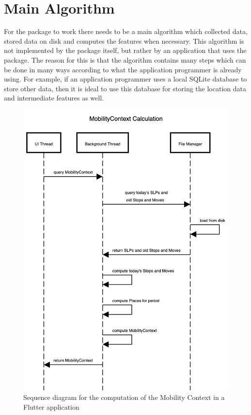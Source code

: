 \section{Main Algorithm}
For the package to work there needs to be a main algorithm which collected data, stored data on disk and computes the features when necessary. This algorithm is not implemented by the package itself, but rather by an application that uses the package. The reason for this is that the algorithm contains many steps which can be done in many ways according to what the application programmer is already using. For example, if an application programmer uses a local SQLite database to store other data, then it is ideal to use this database for storing the location data and intermediate features as well.

\begin{figure}
    \centering
    \includegraphics{images/diagrams/sequence.png}
    \caption{Sequence diagram for the computation of the Mobility Context in a Flutter application}
    \label{fig:sequence-diagram-mobility-context}
\end{figure}